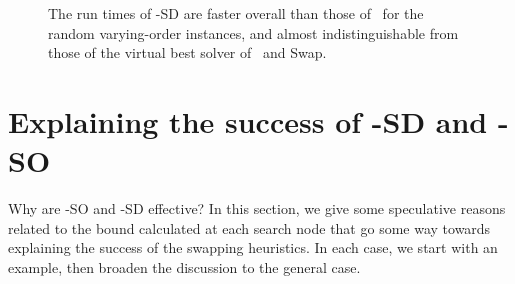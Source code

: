 \begin{figure}[h!]
    \centering
    \caption{The run times of \McSplit-SD are faster overall than those of \McSplit\ for the
        random varying-order instances, and almost indistinguishable from those of the virtual
        best solver of \McSplit\ and \McSplit\-Swap.}
        \label{figure:left-vs-smart-o-mcis}
\end{figure}

\section{Explaining the success of \McSplit-SD and \McSplit-SO}\label{sec:explaining-sd-so}

Why are \McSplit-SO and \McSplit-SD effective?  In this section, we give some
speculative reasons related to the bound calculated at each search node that go
some way towards explaining the success of the swapping heuristics.  In each
case, we start with an example, then broaden the discussion to the general
case.

